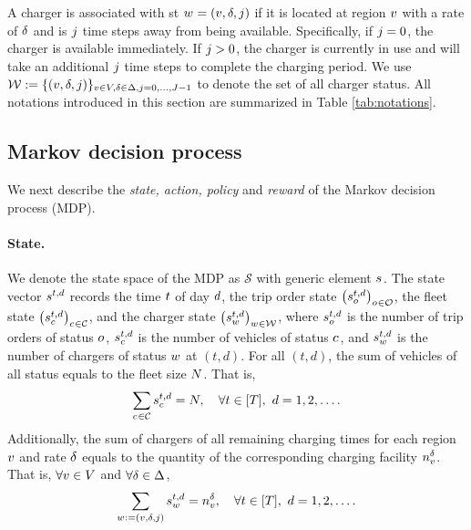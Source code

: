 A charger is associated with st $w_{}= (v, \delta, j)$ if it is located at region $v$ with a rate of $\delta$ and is $j$ time steps away from being available. Specifically, if $j = 0$, the charger is available immediately. If $j > 0$, the charger is currently in use and will take an additional $j$ time steps to complete the charging period. We use $\mathcal{W} := \{(v, \delta, j)\}_{v \in V, \delta \in \Delta, j = 0, \dots, J - 1}$ to denote the set of all charger status. All notations introduced in this section are summarized in Table \ref{tab:notations}.

\subsection{Markov decision process} \label{subsec:MDP}
We next describe the \emph{state, action, policy} and \emph{reward} of the Markov decision process (MDP). 


\paragraph{State.} We denote the state space of the MDP as $\mathcal{S}$ with generic element $s_{}^{}$. The state vector $s_{}^{t,d}$ records the time $t$ of day $d$, the trip order state $\left(s_{o_{}}^{t,d} \right)_{o_{} \in \mathcal{O}}$, the fleet state $\left(s_{c_{}}^{t,d} \right)_{c_{} \in \mathcal{C}}$, and the charger state $\left(s_{w_{}}^{t,d} \right)_{w_{} \in \mathcal{W}}$, where $s_{o_{}}^{t,d}$ is the number of trip orders of status $o_{}$, $s_{c_{}}^{t,d}$ is the number of vehicles of status $c_{}$, and $s_{w_{}}^{t, d}$ is the number of chargers of status $w_{}$ at $(t, d)$. For all $(t, d)$, the sum of vehicles of all status equals to the fleet size $N$. That is, 
\begin{equation} \label{eq:setup-car-total-flow}
    \sum_{c_{} \in \mathcal{C}} s_{c_{}}^{t, d} = N,\quad \forall t \in [T],\ d = 1, 2, \dots.
\end{equation}
Additionally, the sum of chargers of all remaining charging times for each region $v$ and rate $\delta$ equals to the quantity of the corresponding charging facility $n_{v}^{\delta}$. That is, $\forall v \in V$ and $\forall \delta \in \Delta$,
\begin{equation} \label{eq:setup-charger-total-num}
    \sum_{w_{} := (v, \delta, j)} s_{w_{}}^{t, d} = n_{v}^{\delta},\quad \forall t \in [T],\ d = 1, 2, \dots.
\end{equation}

